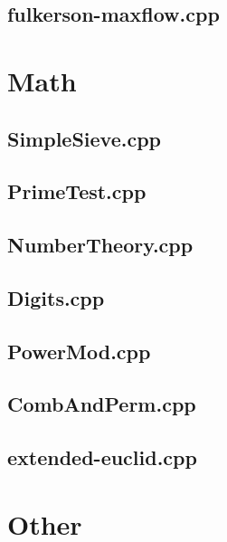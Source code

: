 \documentclass[10pt,twocolumn,landscape]{article}
\begin{document}
\subsection{fulkerson-maxflow.cpp}


\section{Math}

\subsection{SimpleSieve.cpp}


\subsection{PrimeTest.cpp}


\subsection{NumberTheory.cpp}


\subsection{Digits.cpp}


\subsection{PowerMod.cpp}


\subsection{CombAndPerm.cpp}


\subsection{extended-euclid.cpp}


\section{Other}
\end{document}
